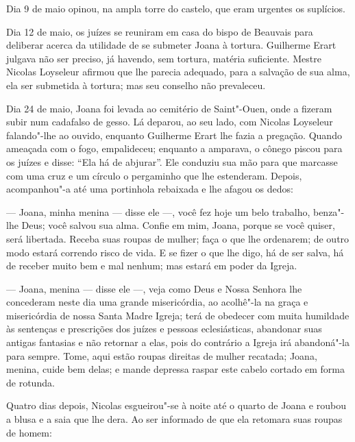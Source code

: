 Dia 9 de maio opinou, na ampla torre do castelo, que eram urgentes os
suplícios.

Dia 12 de maio, os juízes se reuniram em casa do bispo de Beauvais para
deliberar acerca da utilidade de se submeter Joana à tortura. Guilherme
Erart julgava não ser preciso, já havendo, sem tortura, matéria
suficiente. Mestre Nicolas Loyseleur afirmou que lhe parecia adequado,
para a salvação de sua alma, ela ser submetida à tortura; mas seu conselho
não prevaleceu.

Dia 24 de maio, Joana foi levada ao cemitério de Saint"-Ouen, onde a fizeram
subir num cadafalso de gesso. Lá deparou, ao seu lado, com Nicolas
Loyseleur falando"-lhe ao ouvido, enquanto Guilherme Erart lhe fazia a
pregação. Quando ameaçada com o fogo, empalideceu; enquanto a amparava, o
cônego piscou para os juízes e disse: “Ela há de abjurar”. Ele conduziu
sua mão para que marcasse com uma cruz e um círculo o pergaminho que lhe
estenderam. Depois, acompanhou"-a até uma portinhola rebaixada e lhe afagou
os dedos:

--- Joana, minha menina --- disse ele ---, você fez hoje um belo trabalho, benza"-lhe
Deus; você salvou sua alma. Confie em mim, Joana, porque se você quiser,
será libertada. Receba suas roupas de mulher; faça o que lhe ordenarem; de
outro modo estará correndo risco de vida. E se fizer o que lhe digo, há de
ser salva, há de receber muito bem e mal nenhum; mas estará em poder da
Igreja.


--- Joana, menina --- disse ele ---, veja como Deus e Nossa Senhora lhe concederam
neste dia uma grande misericórdia, ao acolhê"-la na graça e misericórdia de
nossa Santa Madre Igreja; terá de obedecer com muita humildade às
sentenças e prescrições dos juízes e pessoas eclesiásticas, abandonar suas
antigas fantasias e não retornar a elas, pois do contrário a Igreja irá
abandoná"-la para sempre. Tome, aqui estão roupas direitas de mulher
recatada; Joana, menina, cuide bem delas; e mande depressa raspar este
cabelo cortado em forma de rotunda.

Quatro dias depois, Nicolas esgueirou"-se à noite até o quarto de Joana e
roubou a blusa e a saia que lhe dera. Ao ser informado de que ela retomara
suas roupas de homem:

